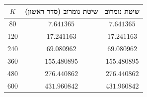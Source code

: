 \begin{tabular}{|c|c|c|}
\hline
$K$ & שיטת נומרוב (סדר ראשון) & שיטת נומרוב \\
\hline
80 & $7.641365$ & $7.641365$ \\
\hline
120 & $17.241163$ & $17.241163$ \\
\hline
240 & $69.080962$ & $69.080962$ \\
\hline
360 & $155.480895$ & $155.480895$ \\
\hline
480 & $276.440862$ & $276.440862$ \\
\hline
600 & $431.960842$ & $431.960842$ \\
\hline
\end{tabular}
